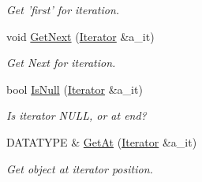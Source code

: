\begin{DoxyCompactItemize}
\begin{DoxyCompactList}\small\item\em \-Get 'first' for iteration. \end{DoxyCompactList}\item 
\hypertarget{class_r_tree_a41da97d27b44e7d7e852150ced23a610}{void \hyperlink{class_r_tree_a41da97d27b44e7d7e852150ced23a610}{\-Get\-Next} (\hyperlink{class_r_tree_1_1_iterator}{\-Iterator} \&a\-\_\-it)}\label{class_r_tree_a41da97d27b44e7d7e852150ced23a610}

\begin{DoxyCompactList}\small\item\em \-Get \-Next for iteration. \end{DoxyCompactList}\item 
\hypertarget{class_r_tree_a8b8c51698e5b8df1e715650a43aad7f4}{bool \hyperlink{class_r_tree_a8b8c51698e5b8df1e715650a43aad7f4}{\-Is\-Null} (\hyperlink{class_r_tree_1_1_iterator}{\-Iterator} \&a\-\_\-it)}\label{class_r_tree_a8b8c51698e5b8df1e715650a43aad7f4}

\begin{DoxyCompactList}\small\item\em \-Is iterator \-N\-U\-L\-L, or at end? \end{DoxyCompactList}\item 
\hypertarget{class_r_tree_aab228fbd816b5e5c93666c37b47635f3}{\-D\-A\-T\-A\-T\-Y\-P\-E \& \hyperlink{class_r_tree_aab228fbd816b5e5c93666c37b47635f3}{\-Get\-At} (\hyperlink{class_r_tree_1_1_iterator}{\-Iterator} \&a\-\_\-it)}\label{class_r_tree_aab228fbd816b5e5c93666c37b47635f3}

\begin{DoxyCompactList}\small\item\em \-Get object at iterator position. \end{DoxyCompactList}\end{DoxyCompactItemize}
